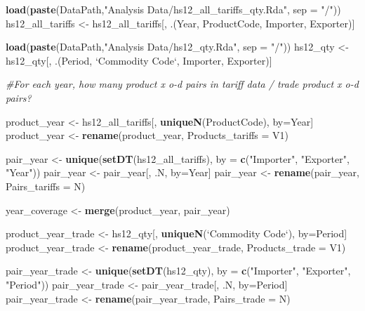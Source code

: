 \documentclass[10pt,]{article}
\newenvironment{Shaded}{\begin{snugshade}}{\end{snugshade}}
\newcommand{\KeywordTok}[1]{\textcolor[rgb]{0.13,0.29,0.53}{\textbf{{#1}}}}
\newcommand{\DataTypeTok}[1]{\textcolor[rgb]{0.13,0.29,0.53}{{#1}}}
\newcommand{\StringTok}[1]{\textcolor[rgb]{0.31,0.60,0.02}{{#1}}}
\newcommand{\CommentTok}[1]{\textcolor[rgb]{0.56,0.35,0.01}{\textit{{#1}}}}
\newcommand{\NormalTok}[1]{{#1}}
\begin{document}
\begin{Shaded}
\begin{Highlighting}[]
\KeywordTok{load}\NormalTok{(}\KeywordTok{paste}\NormalTok{(DataPath,}\StringTok{"Analysis Data/hs12_all_tariffs_qty.Rda"}\NormalTok{, }\DataTypeTok{sep =} \StringTok{"/"}\NormalTok{))}
\NormalTok{hs12_all_tariffs <-}\StringTok{ }\NormalTok{hs12_all_tariffs[, .(Year, ProductCode, Importer, Exporter)]}

\KeywordTok{load}\NormalTok{(}\KeywordTok{paste}\NormalTok{(DataPath,}\StringTok{"Analysis Data/hs12_qty.Rda"}\NormalTok{, }\DataTypeTok{sep =} \StringTok{"/"}\NormalTok{))}
\NormalTok{hs12_qty <-}\StringTok{ }\NormalTok{hs12_qty[, .(Period, }\StringTok{`}\DataTypeTok{Commodity Code}\StringTok{`}\NormalTok{, Importer, Exporter)]}

\CommentTok{#For each year, how many product x o-d pairs in tariff data / trade product x o-d pairs?}

\NormalTok{product_year <-}\StringTok{ }\NormalTok{hs12_all_tariffs[, }\KeywordTok{uniqueN}\NormalTok{(ProductCode), by=Year]}
\NormalTok{product_year <-}\StringTok{ }\KeywordTok{rename}\NormalTok{(product_year, }\DataTypeTok{Products_tariffs =} \NormalTok{V1)}

\NormalTok{pair_year <-}\StringTok{ }\KeywordTok{unique}\NormalTok{(}\KeywordTok{setDT}\NormalTok{(hs12_all_tariffs), }\DataTypeTok{by =} \KeywordTok{c}\NormalTok{(}\StringTok{"Importer"}\NormalTok{, }\StringTok{"Exporter"}\NormalTok{, }\StringTok{"Year"}\NormalTok{))}
\NormalTok{pair_year <-}\StringTok{ }\NormalTok{pair_year[, .N, by=Year]}
\NormalTok{pair_year <-}\StringTok{ }\KeywordTok{rename}\NormalTok{(pair_year, }\DataTypeTok{Pairs_tariffs =} \NormalTok{N)}

\NormalTok{year_coverage <-}\StringTok{ }\KeywordTok{merge}\NormalTok{(product_year, pair_year)}

\NormalTok{product_year_trade <-}\StringTok{ }\NormalTok{hs12_qty[, }\KeywordTok{uniqueN}\NormalTok{(}\StringTok{`}\DataTypeTok{Commodity Code}\StringTok{`}\NormalTok{), by=Period]}
\NormalTok{product_year_trade <-}\StringTok{ }\KeywordTok{rename}\NormalTok{(product_year_trade, }\DataTypeTok{Products_trade =} \NormalTok{V1)}

\NormalTok{pair_year_trade <-}\StringTok{ }\KeywordTok{unique}\NormalTok{(}\KeywordTok{setDT}\NormalTok{(hs12_qty), }\DataTypeTok{by =} \KeywordTok{c}\NormalTok{(}\StringTok{"Importer"}\NormalTok{, }\StringTok{"Exporter"}\NormalTok{, }\StringTok{"Period"}\NormalTok{))}
\NormalTok{pair_year_trade <-}\StringTok{ }\NormalTok{pair_year_trade[, .N, by=Period]}
\NormalTok{pair_year_trade <-}\StringTok{ }\KeywordTok{rename}\NormalTok{(pair_year_trade, }\DataTypeTok{Pairs_trade =} \NormalTok{N)}


\end{Highlighting}
\end{Shaded}
\end{document}
